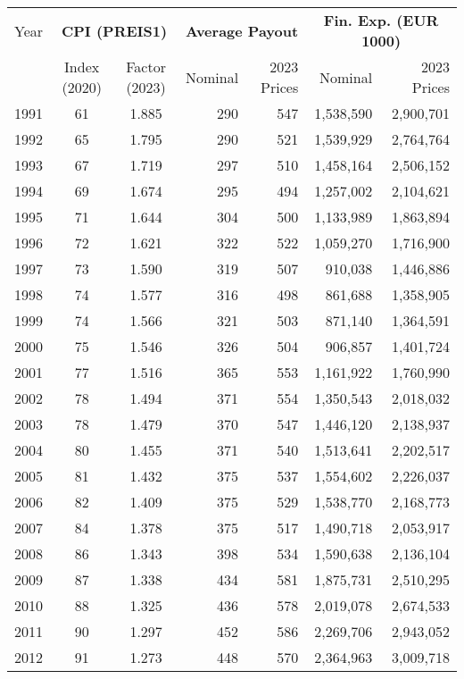 \begin{table}[H]
\centering
\begin{tabular}{rcc|rr|rr}
\hline
Year & \multicolumn{2}{c|}{\textbf{CPI (PREIS1)}} & \multicolumn{2}{c|}{\textbf{Average Payout}} & \multicolumn{2}{c}{\textbf{Fin. Exp. (EUR 1000)}} \\
\cline{2-7}
& Index (2020) & Factor (2023) & Nominal & 2023 Prices & Nominal & 2023 Prices \\
\hline
1991 & 61 & 1.885 & 290 & 547 & 1,538,590 & 2,900,701 \\
1992 & 65 & 1.795 & 290 & 521 & 1,539,929 & 2,764,764 \\
1993 & 67 & 1.719 & 297 & 510 & 1,458,164 & 2,506,152 \\
1994 & 69 & 1.674 & 295 & 494 & 1,257,002 & 2,104,621 \\
1995 & 71 & 1.644 & 304 & 500 & 1,133,989 & 1,863,894 \\
1996 & 72 & 1.621 & 322 & 522 & 1,059,270 & 1,716,900 \\
1997 & 73 & 1.590 & 319 & 507 & 910,038 & 1,446,886 \\
1998 & 74 & 1.577 & 316 & 498 & 861,688 & 1,358,905 \\
1999 & 74 & 1.566 & 321 & 503 & 871,140 & 1,364,591 \\
2000 & 75 & 1.546 & 326 & 504 & 906,857 & 1,401,724 \\
2001 & 77 & 1.516 & 365 & 553 & 1,161,922 & 1,760,990 \\
2002 & 78 & 1.494 & 371 & 554 & 1,350,543 & 2,018,032 \\
2003 & 78 & 1.479 & 370 & 547 & 1,446,120 & 2,138,937 \\
2004 & 80 & 1.455 & 371 & 540 & 1,513,641 & 2,202,517 \\
2005 & 81 & 1.432 & 375 & 537 & 1,554,602 & 2,226,037 \\
2006 & 82 & 1.409 & 375 & 529 & 1,538,770 & 2,168,773 \\
2007 & 84 & 1.378 & 375 & 517 & 1,490,718 & 2,053,917 \\
2008 & 86 & 1.343 & 398 & 534 & 1,590,638 & 2,136,104 \\
2009 & 87 & 1.338 & 434 & 581 & 1,875,731 & 2,510,295 \\
2010 & 88 & 1.325 & 436 & 578 & 2,019,078 & 2,674,533 \\
2011 & 90 & 1.297 & 452 & 586 & 2,269,706 & 2,943,052 \\
2012 & 91 & 1.273 & 448 & 570 & 2,364,963 & 3,009,718 \\

\end{tabular}
\end{table}
